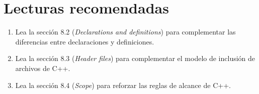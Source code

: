 \section{Lecturas recomendadas}

\begin{enumerate}

\item Lea la sección 8.2 (\emph{Declarations and definitions}) para complementar
      las diferencias entre declaraciones y definiciones.

\item Lea la sección 8.3 (\emph{Header files}) para complementar el modelo
      de inclusión de archivos de C++.

\item Lea la sección 8.4 (\emph{Scope}) para reforzar las reglas de alcance de C++.

\end{enumerate}
